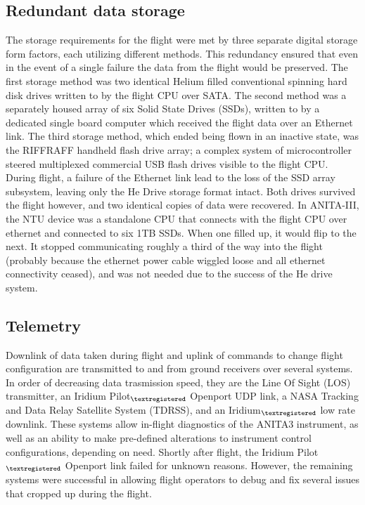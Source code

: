 	\subsection{Redundant data storage}
		The storage requirements for the flight were met by three separate digital storage form factors, each utilizing different methods.  This redundancy ensured that even in the event of a single failure the data from the flight would be preserved.  The first storage method was two identical Helium filled conventional spinning hard disk drives written to by the flight CPU over SATA.  The second method was a separately housed array of six Solid State Drives (SSDs), written to by a dedicated single board computer which received the flight data over an Ethernet link.  The third storage method, which ended being flown in an inactive state, was the RIFFRAFF handheld flash drive array; a complex system of microcontroller steered multiplexed commercial USB flash drives visible to the flight CPU.  During flight, a failure of the Ethernet link lead to the loss of the SSD array subsystem, leaving only the He Drive storage format intact.  Both drives survived the flight however, and two identical copies of data were recovered.
		In ANITA-III, the NTU device was a standalone CPU that connects with the flight CPU over ethernet and connected to six 1TB SSDs.  When one filled up, it would flip to the next.  It stopped communicating roughly a third of the way into the flight (probably because the ethernet power cable wiggled loose and all ethernet connectivity ceased), and was not needed due to the success of the He drive system.
		
	
	\subsection{Telemetry}
		Downlink of data taken during flight and uplink of commands to change flight configuration are transmitted to and from ground receivers over several systems.  In order of decreasing data trasmission speed, they are the Line Of Sight (LOS) transmitter, an Iridium Pilot$_{\textregistered}$ Openport UDP link, a NASA Tracking and Data Relay Satellite System (TDRSS), and an Iridium$_{\textregistered}$ low rate downlink.  These systems allow in-flight diagnostics of the ANITA3 instrument, as well as an ability to make pre-defined alterations to instrument control configurations, depending on need.  Shortly after flight, the Iridium Pilot$_{\textregistered}$ Openport link failed for unknown reasons.  However, the remaining systems were successful in allowing flight operators to debug and fix several issues that cropped up during the flight.  %
		
